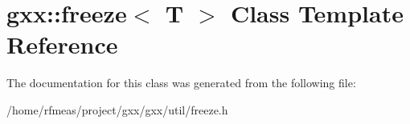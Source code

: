 \hypertarget{classgxx_1_1freeze}{}\section{gxx\+:\+:freeze$<$ T $>$ Class Template Reference}
\label{classgxx_1_1freeze}


The documentation for this class was generated from the following file\+:\begin{DoxyCompactItemize}
\item 
/home/rfmeas/project/gxx/gxx/util/freeze.\+h\end{DoxyCompactItemize}
